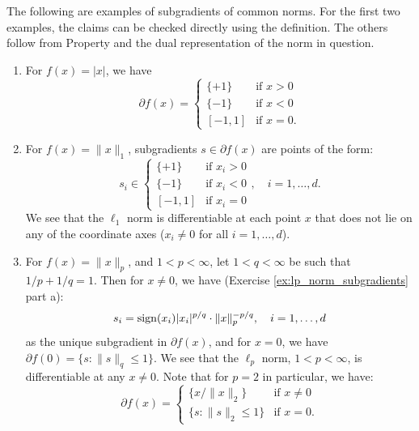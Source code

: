 \begin{Example}
\label{xa:norm_subgradients}
The following are examples of subgradients of common norms. For the first two
examples, the claims can be checked directly using the definition. The others
follow from Property  and the dual
representation of the norm in question. 

\begin{enumerate}[label=\alph*., ref=\alph*]
\item For $f(x) = |x|$, we have 
  \[
  \partial f(x) = \begin{cases}
  \{+1\} & \text{if $x > 0$} \\
  \{-1\} & \text{if $x < 0$} \\
  [-1,1] & \text{if $x = 0$}.
  \end{cases}
  \]

\item {}
  For $f(x) = \|x\|_1$, subgradients $s \in \partial f(x)$ are points of the
  form:  
  \[
  s_i \in \begin{cases}
  \{+1\} & \text{if $x_i > 0$} \\
  \{-1\} & \text{if $x_i < 0$} \\
  [-1,1] & \text{if $x_i = 0$}
  \end{cases}, \quad i=1,\dots,d.
  \]
  We see that the $\ell_1$ norm is differentiable at each point $x$ that does
  not lie on any of the coordinate axes ($x_i \not=0$ for all 
  $i=1,\dots,d$).  

\item {}
  For $f(x) = \|x\|_p$, and $1 < p < \infty$, let $1 < q < \infty$ be such that
  $1/p + 1/q = 1$. Then for $x \not= 0$, we have (Exercise
  \ref{ex:lp_norm_subgradients} part a):   
  \[
  s_i = \operatorname{sign}(x_i) |x_i|^{p/q} \cdot \|x\|_p^{-p/q}, \quad i=1,\dots,d 
  \]
  as the unique subgradient in $\partial f(x)$, and for $x=0$, we have $\partial
  f(0) = \{s : \|s\|_q \leq 1\}$. We see that the $\ell_p$ norm, $1 < p <
  \infty$, is differentiable at any $x \not= 0$. Note that for $p=2$ in
  particular, we have:
  \[
  \partial f(x) = \begin{cases}
  \{x / \|x\|_2\} & \text{if $x \not= 0$} \\
  \{s : \|s\|_2 \leq 1\} & \text{if $x = 0$}.
  \end{cases}
  \]


\end{enumerate}
\end{Example}
